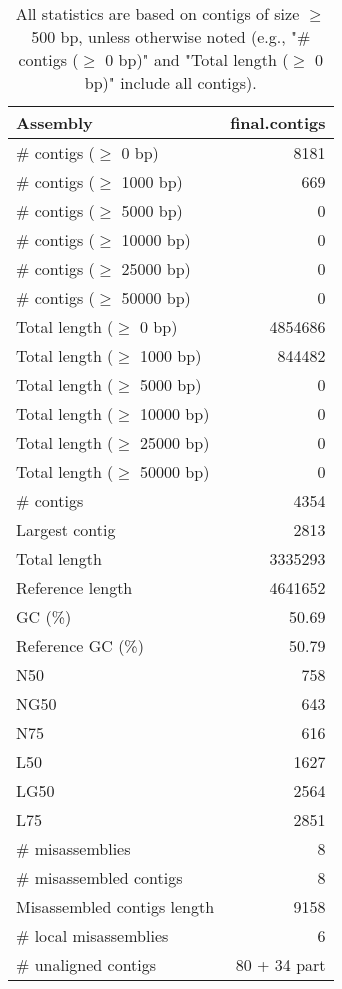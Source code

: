 \documentclass[12pt,a4paper]{article}
\begin{document}
\begin{table}[ht]
\begin{center}
\caption{All statistics are based on contigs of size $\geq$ 500 bp, unless otherwise noted (e.g., "\# contigs ($\geq$ 0 bp)" and "Total length ($\geq$ 0 bp)" include all contigs).}
\begin{tabular}{|l*{1}{|r}|}
\hline
Assembly & final.contigs \\ \hline
\# contigs ($\geq$ 0 bp) & 8181 \\ \hline
\# contigs ($\geq$ 1000 bp) & 669 \\ \hline
\# contigs ($\geq$ 5000 bp) & 0 \\ \hline
\# contigs ($\geq$ 10000 bp) & 0 \\ \hline
\# contigs ($\geq$ 25000 bp) & 0 \\ \hline
\# contigs ($\geq$ 50000 bp) & 0 \\ \hline
Total length ($\geq$ 0 bp) & 4854686 \\ \hline
Total length ($\geq$ 1000 bp) & 844482 \\ \hline
Total length ($\geq$ 5000 bp) & 0 \\ \hline
Total length ($\geq$ 10000 bp) & 0 \\ \hline
Total length ($\geq$ 25000 bp) & 0 \\ \hline
Total length ($\geq$ 50000 bp) & 0 \\ \hline
\# contigs & 4354 \\ \hline
Largest contig & 2813 \\ \hline
Total length & 3335293 \\ \hline
Reference length & 4641652 \\ \hline
GC (\%) & 50.69 \\ \hline
Reference GC (\%) & 50.79 \\ \hline
N50 & 758 \\ \hline
NG50 & 643 \\ \hline
N75 & 616 \\ \hline
L50 & 1627 \\ \hline
LG50 & 2564 \\ \hline
L75 & 2851 \\ \hline
\# misassemblies & 8 \\ \hline
\# misassembled contigs & 8 \\ \hline
Misassembled contigs length & 9158 \\ \hline
\# local misassemblies & 6 \\ \hline
\# unaligned contigs & 80 + 34 part \\ \hline

\end{tabular}
\end{center}
\end{table}
\end{document}
